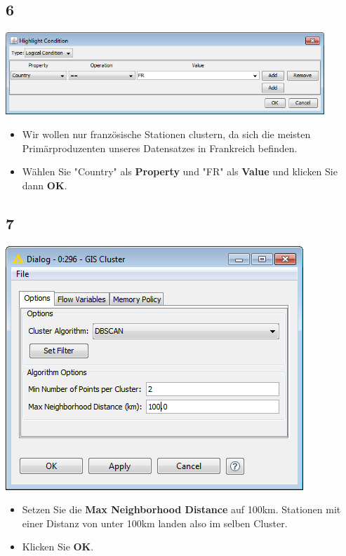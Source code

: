 \documentclass{beamer}
\begin{document}
\subsection{6}
\begin{frame}
	\begin{center}
  		\includegraphics[width=0.9\textwidth]{6.png}
	\end{center}
	\begin{itemize}
		\item Wir wollen nur französische Stationen clustern, da sich die meisten Primärproduzenten unseres Datensatzes in Frankreich befinden.
		\item Wählen Sie "Country" als \textbf{Property} und "FR" als \textbf{Value} und klicken Sie dann \textbf{OK}.
	\end{itemize}
\end{frame}

\subsection{7}
\begin{frame}
	\begin{center}
  		\includegraphics[height=0.6\textheight]{7.png}
	\end{center}
	\begin{itemize}
		\item Setzen Sie die \textbf{Max Neighborhood Distance} auf 100km. Stationen mit einer Distanz von unter 100km landen also im selben Cluster.
		\item Klicken Sie \textbf{OK}.
	\end{itemize}
\end{frame}
\end{document}
